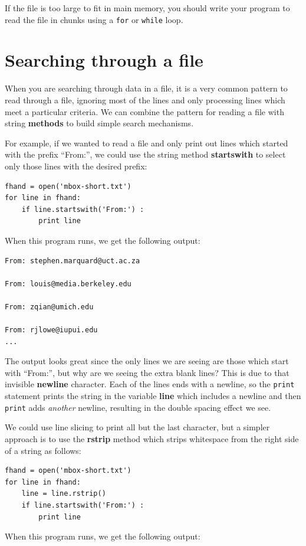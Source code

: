 \documentclass[10pt]{book}
\begin{document}
If the file is too large to fit in main memory, you should write
your program to read the file in chunks using a {\tt for} or {\tt while}
loop.

\section{Searching through a file}

When you are searching through data in a file, it
is a very common pattern to read through a file, ignoring most
of the lines and only processing lines which meet a particular criteria.
We can combine the pattern for reading a file with string {\bf methods}
to build simple search mechanisms.

For example, if we wanted to read a file and only print out lines
which started with the prefix ``From:'', we could use the 
string method {\bf startswith} to select only those lines with
the desired prefix:

\beforeverb
\begin{verbatim}
fhand = open('mbox-short.txt')
for line in fhand:
    if line.startswith('From:') :
        print line
\end{verbatim}
\afterverb
%
When this program runs, we get the following output:

\beforeverb
\begin{verbatim}
From: stephen.marquard@uct.ac.za

From: louis@media.berkeley.edu

From: zqian@umich.edu

From: rjlowe@iupui.edu
...
\end{verbatim}
\afterverb
%
The output looks great since the only lines we are seeing are those 
which start with ``From:'', but why are we seeing the extra blank
lines?  This is due to that invisible {\bf newline} character.
Each of the lines ends with a newline, so the {\tt print} 
statement prints the string in the variable {\bf line} which includes
a newline and then {\tt print} adds \emph{another} newline, resulting
in the double spacing effect we see.

We could use line slicing to print all but the last character, but 
a simpler approach is to use the {\bf rstrip} method which strips
whitespace from the right side of a string as follows:

\beforeverb
\begin{verbatim}
fhand = open('mbox-short.txt')
for line in fhand:
    line = line.rstrip()
    if line.startswith('From:') :
        print line
\end{verbatim}
\afterverb
%
When this program runs, we get the following output:
\end{document}
